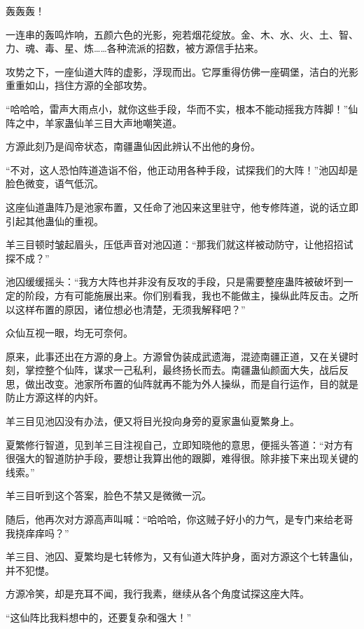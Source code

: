 
\begin{this_body}

轰轰轰！

一连串的轰鸣炸响，五颜六色的光影，宛若烟花绽放。金、木、水、火、土、智、力、魂、毒、星、炼……各种流派的招数，被方源信手拈来。

攻势之下，一座仙道大阵的虚影，浮现而出。它厚重得仿佛一座碉堡，洁白的光影重重如山，挡住方源的全部攻势。

“哈哈哈，雷声大雨点小，就你这些手段，华而不实，根本不能动摇我方阵脚！”仙阵之中，羊家蛊仙羊三目大声地嘲笑道。

方源此刻乃是阎帝状态，南疆蛊仙因此辨认不出他的身份。

“不对，这人恐怕阵道造诣不俗，他正动用各种手段，试探我们的大阵！”池囚却是脸色微变，语气低沉。

这座仙道蛊阵乃是池家布置，又任命了池囚来这里驻守，他专修阵道，说的话立即引起其他蛊仙的重视。

羊三目顿时皱起眉头，压低声音对池囚道：“那我们就这样被动防守，让他招招试探不成？”

池囚缓缓摇头：“我方大阵也并非没有反攻的手段，只是需要整座蛊阵被破坏到一定的阶段，方有可能施展出来。你们别看我，我也不能做主，操纵此阵反击。之所以这样布置的原因，诸位想必也清楚，无须我解释吧？”

众仙互视一眼，均无可奈何。

原来，此事还出在方源的身上。方源曾伪装成武遗海，混迹南疆正道，又在关键时刻，掌控整个仙阵，谋求一己私利，最终扬长而去。南疆蛊仙颜面大失，战后反思，做出改变。池家所布置的仙阵就再不能为外人操纵，而是自行运作，目的就是防止方源这样的内奸。

羊三目见池囚没有办法，便又将目光投向身旁的夏家蛊仙夏繁身上。

夏繁修行智道，见到羊三目注视自己，立即知晓他的意思，便摇头答道：“对方有很强大的智道防护手段，要想让我算出他的跟脚，难得很。除非接下来出现关键的线索。”

羊三目听到这个答案，脸色不禁又是微微一沉。

随后，他再次对方源高声叫喊：“哈哈哈，你这贼子好小的力气，是专门来给老哥我挠痒痒吗？”

羊三目、池囚、夏繁均是七转修为，又有仙道大阵护身，面对方源这个七转蛊仙，并不犯憷。

方源冷笑，却是充耳不闻，我行我素，继续从各个角度试探这座大阵。

“这仙阵比我料想中的，还要复杂和强大！”


\end{this_body}
